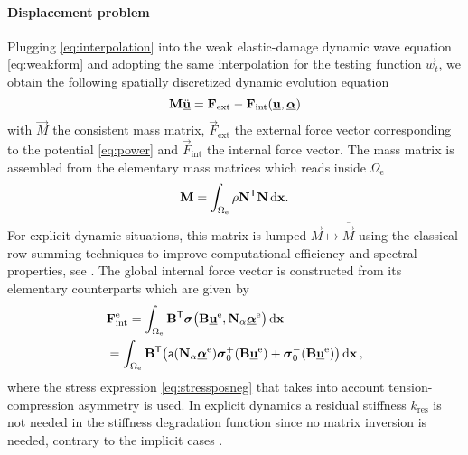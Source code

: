 \paragraph{Displacement problem}
Plugging \eqref{eq:interpolation} into the weak elastic-damage dynamic wave equation \eqref{eq:weakform} and adopting the same interpolation for the testing function $\vec{w}_t$, we obtain the following spatially discretized dynamic evolution equation
\begin{equation} \label{eq:waveeqsdis}
\vec{M}\ddot{\uvec}=\vec{F}_\mathrm{ext}-\vec{F}_\mathrm{int}(\uvec,\dvec)
\end{equation}
with $\vec{M}$ the consistent mass matrix, $\vec{F}_\mathrm{ext}$ the external force vector corresponding to the potential \eqref{eq:power} and $\vec{F}_\mathrm{int}$ the internal force vector. The mass matrix is assembled from the elementary mass matrices which reads inside $\Omega_\mathrm{e}$
\[
\vec{M}=\int_{\Omega_\mathrm{e}}\rho\vec{N}^\mT\vec{N}\dx.
\]
For explicit dynamic situations, this matrix is lumped $\vec{M}\mapsto \overline{\vec{M}}$ using the classical row-summing techniques to improve computational efficiency and spectral properties, see \cite{Hughes:2010}. The global internal force vector is constructed from its elementary counterparts which are given by
\begin{equation} \label{eq:Fint}
\begin{aligned}
& \vec{F}_\mathrm{int}^\me=\int_{\Omega_\me}\vec{B}^\mT\sig\bigl(\vec{B}\uvec^\me,\vec{N}_\alpha\dvec^\me\bigr)\dx \\
&= \int_{\Omega_\me}\vec{B}^\mT\bigl(\mathsf{a}(\vec{N}_\alpha\dvec^\me)\sig_0^+(\vec{B}\uvec^\me)+\sig_0^-(\vec{B}\uvec^\me)\bigr)\dx\,,
\end{aligned}
\end{equation}
where the stress expression \eqref{eq:stressposneg} that takes into account tension-compression asymmetry is used. In explicit dynamics a residual stiffness $k_\mathrm{res}$ is not needed in the stiffness degradation function since no matrix inversion is needed, contrary to the implicit cases \cite{PhamAmorMarigoMaurini:2011,SchlueterWillenbuecherKuhnMueller:2014}.

